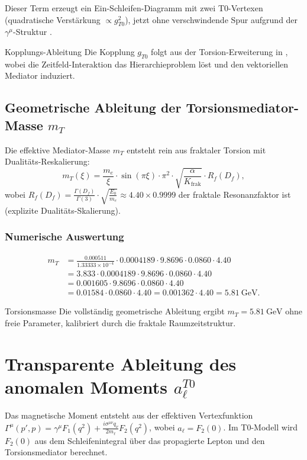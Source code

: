 \documentclass[12pt,a4paper]{article}
\begin{document}
	Dieser Term erzeugt ein Ein-Schleifen-Diagramm mit zwei T0-Vertexen (quadratische Verstärkung $\propto g_{T0}^2$), jetzt ohne verschwindende Spur aufgrund der $\gamma^\mu$-Struktur \cite{bell_muon}.
	
	\begin{derivation}{Kopplungs-Ableitung}
		Die Kopplung $g_{T0}$ folgt aus der Torsion-Erweiterung in \cite{QFT_T0}, wobei die Zeitfeld-Interaktion das Hierarchieproblem löst und den vektoriellen Mediator induziert.
	\end{derivation}
	
	\subsection{Geometrische Ableitung der Torsionsmediator-Masse $m_T$}
	Die effektive Mediator-Masse $m_T$ entsteht rein aus fraktaler Torsion mit Dualitäts-Reskalierung:
	\begin{equation}
		m_T(\xi) = \frac{m_e}{\xi} \cdot \sin(\pi \xi) \cdot \pi^2 \cdot \sqrt{\frac{\alpha}{K_{\text{frak}}}} \cdot R_f(D_f),
	\end{equation}
	wobei $R_f(D_f) = \frac{\Gamma(D_f)}{\Gamma(3)} \cdot \sqrt{\frac{E_0}{m_e}} \approx 4.40 \times 0.9999$ der fraktale Resonanzfaktor ist (explizite Dualitäts-Skalierung).
	
	\subsubsection{Numerische Auswertung}
	\begin{align*}
		m_T &= \frac{0.000511}{1.33333\times 10^{-4}} \cdot 0.0004189 \cdot 9.8696 \cdot 0.0860 \cdot 4.40 \\
		&= 3.833 \cdot 0.0004189 \cdot 9.8696 \cdot 0.0860 \cdot 4.40 \\
		&= 0.001605 \cdot 9.8696 \cdot 0.0860 \cdot 4.40 \\
		&= 0.01584 \cdot 0.0860 \cdot 4.40 = 0.001362 \cdot 4.40 = 5.81\ \text{GeV}.
	\end{align*}
	
	\begin{result}{Torsionsmasse}
		Die vollständig geometrische Ableitung ergibt $m_T = \SI{5.81}{\giga\electronvolt}$ ohne freie Parameter, kalibriert durch die fraktale Raumzeitstruktur.
	\end{result}
	
	\section{Transparente Ableitung des anomalen Moments $a_\ell^{T0}$}
	Das magnetische Moment entsteht aus der effektiven Vertexfunktion $\Gamma^\mu(p',p) = \gamma^\mu F_1(q^2) + \frac{i \sigma^{\mu\nu} q_\nu}{2 m_\ell} F_2(q^2)$, wobei $a_\ell = F_2(0)$. Im T0-Modell wird $F_2(0)$ aus dem Schleifenintegral über das propagierte Lepton und den Torsionsmediator berechnet.
	
\end{document}
